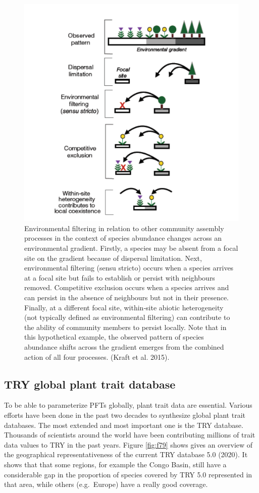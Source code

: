 \documentclass[12pt,oneside]{book}
\begin{document}
\begin{figure}

{\centering \includegraphics[width=0.8\linewidth]{figures/chap7/f78_kraft_filtering} 

}

\caption{Environmental filtering in relation to other community assembly processes in the context of species abundance changes across an environmental gradient. Firstly, a species may be absent from a focal site on the gradient because of dispersal limitation. Next, environmental filtering (sensu stricto) occurs when a species arrives at a focal site but fails to establish or persist with neighbours removed. Competitive exclusion occurs when a species arrives and can persist in the absence of neighbours but not in their presence. Finally, at a different focal site, within‐site abiotic heterogeneity (not typically defined as environmental filtering) can contribute to the ability of community members to persist locally. Note that in this hypothetical example, the observed pattern of species abundance shifts across the gradient emerges from the combined action of all four processes. (Kraft et al. 2015).}\label{fig:f78}
\end{figure}

\subsection{TRY global plant trait
database}\label{try-global-plant-trait-database}

To be able to parameterize PFTs globally, plant trait data are
essential. Various efforts have been done in the past two decades to
synthesize global plant trait databases. The most extended and most
important one is the TRY database. Thousands of scientists around the
world have been contributing millions of trait data values to TRY in the
past years. Figure \ref{fig:f79} shows gives an overview of the
geographical representativeness of the current TRY database 5.0 (2020).
It shows that that some regions, for example the Congo Basin, still have
a considerable gap in the proportion of species covered by TRY 5.0
represented in that area, while others (e.g.~Europe) have a really good
coverage.
\end{document}
